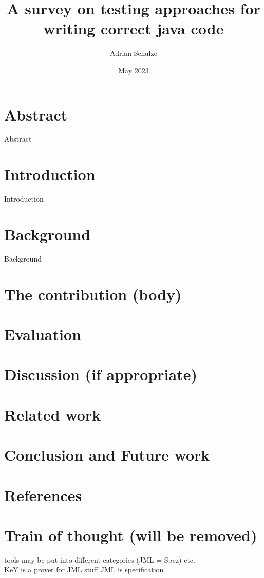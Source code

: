 \documentclass[sigconf]{acmart}
\title{A survey on testing approaches for writing correct java code}
\author{Adrian Schulze }
\date{May 2023}
\begin{document}
	
	\maketitle
	 \section{Abstract}{Abstract}
	 \section{Introduction}{Introduction}
	 \section{Background}{Background}
     \section{The contribution (body)}
	 \section{Evaluation}
	 \section{Discussion (if appropriate)}
	 \section{Related work}
	 \section{Conclusion and Future work}
	 \section{References}
	 \section{Train of thought (will be removed)}
	 	tools may be put into different categories (JML = Spez) etc. \\
	 	KeY is a prover for JML stuff
	 	JML is specification
{}
\end{document}

